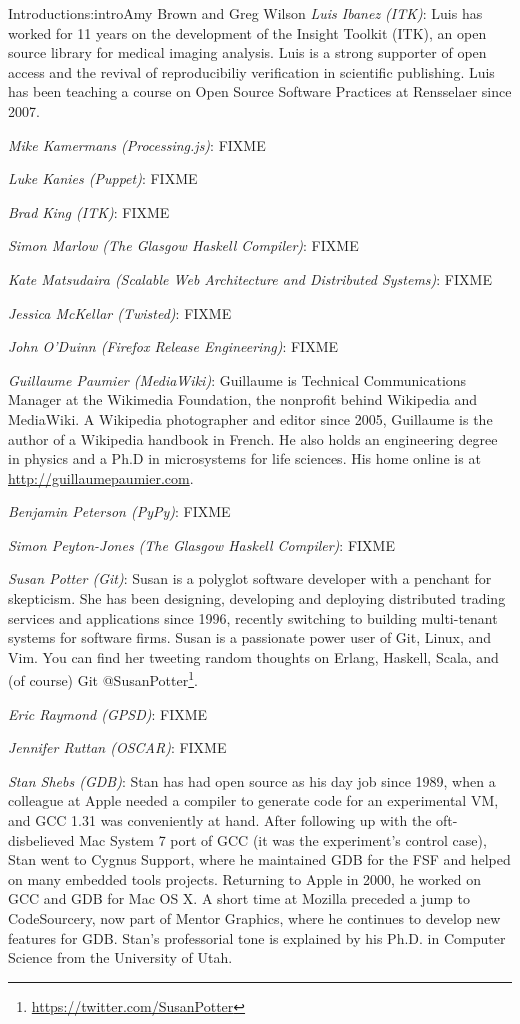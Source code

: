 \begin{aosachapter}{Introduction}{s:intro}{Amy Brown and Greg Wilson}
\emph{Luis Ibanez (ITK)}: Luis has worked for 11 years on the development of
the Insight Toolkit (ITK), an open source library for medical imaging analysis.
Luis is a strong supporter of open access and the revival of reproducibiliy
verification in scientific publishing. Luis has been teaching a course on Open
Source Software Practices at Rensselaer since 2007.

\emph{Mike Kamermans (Processing.js)}: FIXME

\emph{Luke Kanies (Puppet)}: FIXME

\emph{Brad King (ITK)}: FIXME

\emph{Simon Marlow (The Glasgow Haskell Compiler)}: FIXME

\emph{Kate Matsudaira (Scalable Web Architecture and Distributed Systems)}: FIXME

\emph{Jessica McKellar (Twisted)}: FIXME

\emph{John O'Duinn (Firefox Release Engineering)}: FIXME

\emph{Guillaume Paumier (MediaWiki)}: Guillaume is Technical Communications
Manager at the Wikimedia Foundation, the nonprofit  behind Wikipedia
and MediaWiki. A Wikipedia photographer and editor since 2005, Guillaume
is the author of a Wikipedia handbook in French. He also holds an engineering
degree in physics and a Ph.D in microsystems for life sciences. His home online
is at \url{http://guillaumepaumier.com}.

\emph{Benjamin Peterson (PyPy)}: FIXME

\emph{Simon Peyton-Jones (The Glasgow Haskell Compiler)}: FIXME

\emph{Susan Potter (Git)}: Susan is a polyglot software developer with a
penchant for skepticism. She has been designing, developing and deploying
distributed trading services and applications since 1996, recently switching
to building multi-tenant systems for software firms. Susan is a passionate
power user of Git, Linux, and Vim. You can find her tweeting random thoughts
on Erlang, Haskell, Scala, and (of course) Git @SusanPotter\footnote{\url{https://twitter.com/SusanPotter}}.

\emph{Eric Raymond (GPSD)}: FIXME

\emph{Jennifer Ruttan (OSCAR)}: FIXME

\emph{Stan Shebs (GDB)}: Stan has had open source as his day job since
1989, when a colleague at Apple needed a compiler to generate code for
an experimental VM, and GCC 1.31 was conveniently at hand.  After
following up with the oft-disbelieved Mac System 7 port of GCC (it was
the experiment's control case), Stan went to Cygnus Support, where he
maintained GDB for the FSF and helped on many embedded tools projects.
Returning to Apple in 2000, he worked on GCC and GDB for Mac OS X.  A
short time at Mozilla preceded a jump to CodeSourcery, now part of
Mentor Graphics, where he continues to develop new features for GDB.
Stan's professorial tone is explained by his Ph.D. in Computer Science
from the University of Utah.


\end{aosachapter}
